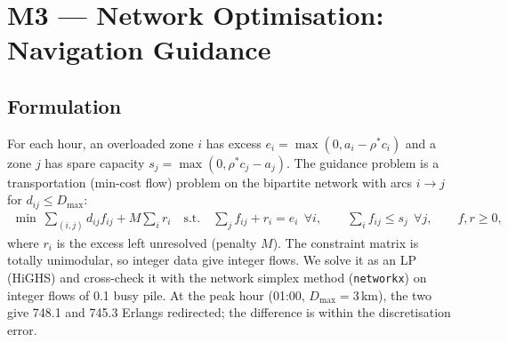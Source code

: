 \documentclass[11pt,a4paper]{article}
\begin{document}
\section{M3 --- Network Optimisation: Navigation Guidance}\label{sec:m3}
\subsection{Formulation}
For each hour, an overloaded zone $i$ has excess $e_i = \max(0, a_i - \rho^* c_i)$ and a zone $j$ has spare capacity $s_j = \max(0, \rho^* c_j - a_j)$. The guidance problem is a transportation (min-cost flow) problem on the bipartite network with arcs $i\to j$ for $d_{ij} \le D_{\max}$:
\begin{align*}
\min\ \sum_{(i,j)} d_{ij} f_{ij} + M\sum_i r_i\quad\text{s.t.}\quad \sum_j f_{ij} + r_i = e_i\ \ \forall i,\qquad \sum_i f_{ij} \le s_j\ \ \forall j,\qquad f, r \ge 0,
\end{align*}
where $r_i$ is the excess left unresolved (penalty $M$). The constraint matrix is totally unimodular, so integer data give integer flows. We solve it as an LP (HiGHS) and cross-check it with the network simplex method (\texttt{networkx}) on integer flows of 0.1 busy pile. At the peak hour (01:00, $D_{\max} = 3$\,km), the two give 748.1 and 745.3 Erlangs redirected; the difference is within the discretisation error.
\end{document}
